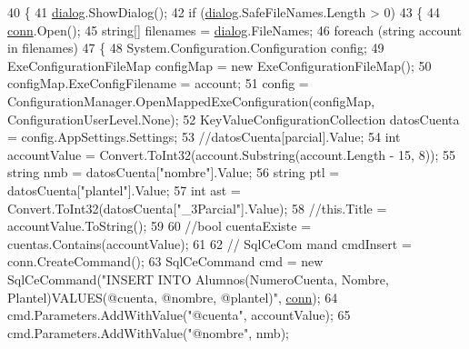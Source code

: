 \begin{DoxyCode}
40             \{
41             \hyperlink{class_importar_cuentas__wpf_1_1_main_window_ac1846e4ecd501ff338ad87a7c7bcb254}{dialog}.ShowDialog();
42             \textcolor{keywordflow}{if} (\hyperlink{class_importar_cuentas__wpf_1_1_main_window_ac1846e4ecd501ff338ad87a7c7bcb254}{dialog}.SafeFileNames.Length > 0)
43                 \{
44                 \hyperlink{class_importar_cuentas__wpf_1_1_main_window_a8ed2f7c907bc1c8faf75d8deb555d137}{conn}.Open();
45                 \textcolor{keywordtype}{string}[] filenames = \hyperlink{class_importar_cuentas__wpf_1_1_main_window_ac1846e4ecd501ff338ad87a7c7bcb254}{dialog}.FileNames;
46                 \textcolor{keywordflow}{foreach} (\textcolor{keywordtype}{string} account \textcolor{keywordflow}{in} filenames)
47                     \{
48                     System.Configuration.Configuration config;
49                     ExeConfigurationFileMap configMap = \textcolor{keyword}{new} ExeConfigurationFileMap();
50                     configMap.ExeConfigFilename = account;
51                     config = ConfigurationManager.OpenMappedExeConfiguration(configMap, 
      ConfigurationUserLevel.None);
52                     KeyValueConfigurationCollection datosCuenta = config.AppSettings.Settings;
53                     \textcolor{comment}{//datosCuenta[parcial].Value;}
54                     \textcolor{keywordtype}{int} accountValue = Convert.ToInt32(account.Substring(account.Length - 15, 8));
55                     \textcolor{keywordtype}{string} nmb = datosCuenta[\textcolor{stringliteral}{"nombre"}].Value;
56                     \textcolor{keywordtype}{string} ptl = datosCuenta[\textcolor{stringliteral}{"plantel"}].Value;
57                     \textcolor{keywordtype}{int} ast = Convert.ToInt32(datosCuenta[\textcolor{stringliteral}{"\_3Parcial"}].Value);
58                     \textcolor{comment}{//this.Title = accountValue.ToString();}
59 
60                    \textcolor{comment}{//bool cuentaExiste = cuentas.Contains(accountValue);}
61 
62                   \textcolor{comment}{//  SqlCeCom  mand cmdInsert = conn.CreateCommand();}
63                     SqlCeCommand cmd = \textcolor{keyword}{new} SqlCeCommand(\textcolor{stringliteral}{"INSERT INTO Alumnos(NumeroCuenta, Nombre,
       Plantel)VALUES(@cuenta, @nombre, @plantel)"}, \hyperlink{class_importar_cuentas__wpf_1_1_main_window_a8ed2f7c907bc1c8faf75d8deb555d137}{conn});
64                     cmd.Parameters.AddWithValue(\textcolor{stringliteral}{"@cuenta"}, accountValue);
65                     cmd.Parameters.AddWithValue(\textcolor{stringliteral}{"@nombre"}, nmb);

\end{DoxyCode}
